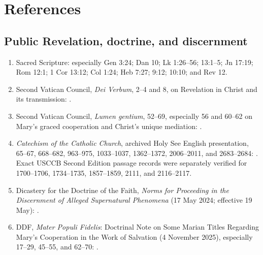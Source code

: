 \section{References}

\begingroup
\footnotesize
\linespread{0.98}\selectfont
\setlength{\parskip}{0pt}

\subsection{Public Revelation, doctrine, and discernment}

\begin{enumerate}
  \item Sacred Scripture: especially Gen 3:24; Dan 10; Lk 1:26--56; 13:1--5; Jn 17:19; Rom 12:1; 1 Cor 13:12; Col 1:24; Heb 7:27; 9:12; 10:10; and Rev 12.
  \item Second Vatican Council, \emph{Dei Verbum}, 2--4 and 8, on Revelation in Christ and its transmission: .
  \item Second Vatican Council, \emph{Lumen gentium}, 52--69, especially 56 and 60--62 on Mary's graced cooperation and Christ's unique mediation: .
  \item \emph{Catechism of the Catholic Church}, archived Holy See English presentation, 65--67, 668--682, 963--975, 1033--1037, 1362--1372, 2006--2011, and 2683--2684: . Exact USCCB Second Edition passage records were separately verified for 1700--1706, 1734--1735, 1857--1859, 2111, and 2116--2117.
  \item Dicastery for the Doctrine of the Faith, \emph{Norms for Proceeding in the Discernment of Alleged Supernatural Phenomena} (17 May 2024; effective 19 May): .
  \item DDF, \emph{Mater Populi Fidelis}: Doctrinal Note on Some Marian Titles Regarding Mary's Cooperation in the Work of Salvation (4 November 2025), especially 17--29, 45--55, and 62--70: .

\end{enumerate}
